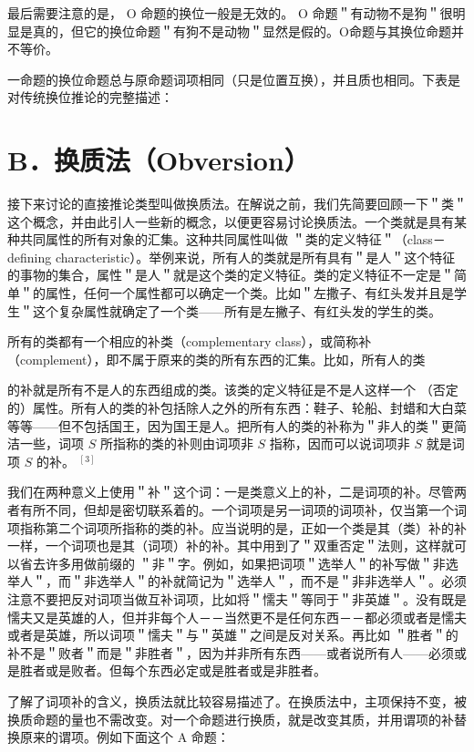 最后需要注意的是， O 命题的换位一般是无效的。 O 命题＂有动物不是狗＂很明显是真的，但它的换位命题＂有狗不是动物＂显然是假的。O命题与其换位命题并不等价。

一命题的换位命题总与原命题词项相同（只是位置互换），并且质也相同。下表是对传统换位推论的完整描述：

\section*{B．换质法（Obversion）}
接下来讨论的直接推论类型叫做换质法。在解说之前，我们先简要回顾一下＂类＂这个概念，并由此引人一些新的概念，以便更容易讨论换质法。一个类就是具有某种共同属性的所有对象的汇集。这种共同属性叫做 ＂类的定义特征＂（class－defining characteristic）。举例来说，所有人的类就是所有具有＂是人＂这个特征的事物的集合，属性＂是人＂就是这个类的定义特征。类的定义特征不一定是＂简单＂的属性，任何一个属性都可以确定一个类。比如＂左撒子、有红头发并且是学生＂这个复杂属性就确定了一个类——所有是左撇子、有红头发的学生的类。

所有的类都有一个相应的补类（complementary class），或简称补 （complement），即不属于原来的类的所有东西的汇集。比如，所有人的类

的补就是所有不是人的东西组成的类。该类的定义特征是不是人这样一个 （否定的）属性。所有人的类的补包括除人之外的所有东西：鞋子、轮船、封蜡和大白菜等等——但不包括国王，因为国王是人。把所有人的类的补称为＂非人的类＂更简洁一些，词项 $S$ 所指称的类的补则由词项非 $S$ 指称，因而可以说词项非 $S$ 就是词项 $S$ 的补。 ${ }^{[3]}$

我们在两种意义上使用＂补＂这个词：一是类意义上的补，二是词项的补。尽管两者有所不同，但却是密切联系着的。一个词项是另一词项的词项补，仅当第一个词项指称第二个词项所指称的类的补。应当说明的是，正如一个类是其（类）补的补一样，一个词项也是其（词项）补的补。其中用到了＂双重否定＂法则，这样就可以省去许多用做前缀的 ＂非＂字。例如，如果把词项＂选举人＂的补写做＂非选举人＂，而＂非选举人＂的补就简记为＂选举人＂，而不是＂非非选举人＂。必须注意不要把反对词项当做互补词项，比如将＂懦夫＂等同于＂非英雄＂。没有既是懦夫又是英雄的人，但并非每个人－－当然更不是任何东西－－都必须或者是懦夫或者是英雄，所以词项＂懦夫＂与＂英雄＂之间是反对关系。再比如 ＂胜者＂的补不是＂败者＂而是＂非胜者＂，因为并非所有东西——或者说所有人——必须或是胜者或是败者。但每个东西必定或是胜者或是非胜者。

了解了词项补的含义，换质法就比较容易描述了。在换质法中，主项保持不变，被换质命题的量也不需改变。对一个命题进行换质，就是改变其质，并用谓项的补替换原来的谓项。例如下面这个 A 命题：

